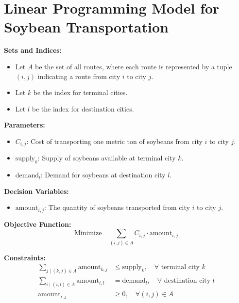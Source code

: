 \documentclass{article}
\begin{document}
\section*{Linear Programming Model for Soybean Transportation}

\textbf{Sets and Indices:}
\begin{itemize}
    \item Let \( A \) be the set of all routes, where each route is represented by a tuple \((i, j)\) indicating a route from city \(i\) to city \(j\).
    \item Let \( k \) be the index for terminal cities.
    \item Let \( l \) be the index for destination cities.
\end{itemize}

\textbf{Parameters:}
\begin{itemize}
    \item \( C_{i,j} \): Cost of transporting one metric ton of soybeans from city \(i\) to city \(j\).
    \item \( \text{supply}_k \): Supply of soybeans available at terminal city \(k\).
    \item \( \text{demand}_l \): Demand for soybeans at destination city \(l\).
\end{itemize}

\textbf{Decision Variables:}
\begin{itemize}
    \item \( \text{amount}_{i,j} \): The quantity of soybeans transported from city \(i\) to city \(j\).
\end{itemize}

\textbf{Objective Function:}
\[
\text{Minimize} \quad \sum_{(i,j) \in A} C_{i,j} \cdot \text{amount}_{i,j}
\]

\textbf{Constraints:}
\begin{align}
    \sum_{j \mid (k, j) \in A} \text{amount}_{k,j} &\leq \text{supply}_k, \quad \forall \text{ terminal city } k \\
    \sum_{i \mid (i, l) \in A} \text{amount}_{i,l} &= \text{demand}_l, \quad \forall \text{ destination city } l \\
    \text{amount}_{i,j} &\geq 0, \quad \forall (i, j) \in A
\end{align}
\end{document}
